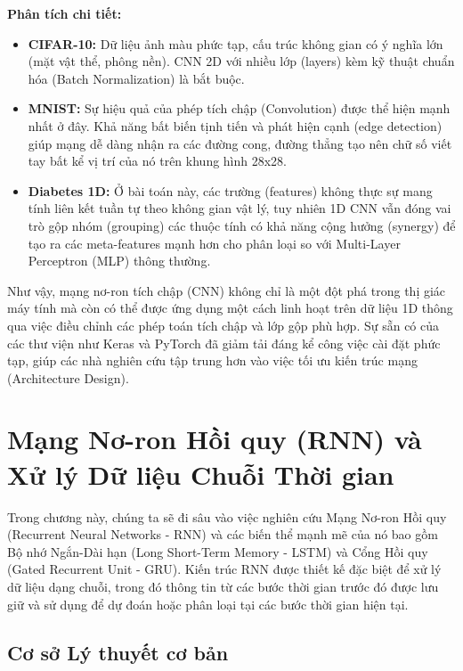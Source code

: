 \documentclass[12pt,a4paper]{article}
\begin{document}
\textbf{Phân tích chi tiết:}
\begin{itemize}
    \item \textbf{CIFAR-10:} Dữ liệu ảnh màu phức tạp, cấu trúc không gian có ý nghĩa lớn (mặt vật thể, phông nền). CNN 2D với nhiều lớp (layers) kèm kỹ thuật chuẩn hóa (Batch Normalization) là bắt buộc.
    \item \textbf{MNIST:} Sự hiệu quả của phép tích chập (Convolution) được thể hiện mạnh nhất ở đây. Khả năng bất biến tịnh tiến và phát hiện cạnh (edge detection) giúp mạng dễ dàng nhận ra các đường cong, đường thẳng tạo nên chữ số viết tay bất kể vị trí của nó trên khung hình 28x28.
    \item \textbf{Diabetes 1D:} Ở bài toán này, các trường (features) không thực sự mang tính liên kết tuần tự theo không gian vật lý, tuy nhiên 1D CNN vẫn đóng vai trò gộp nhóm (grouping) các thuộc tính có khả năng cộng hưởng (synergy) để tạo ra các meta-features mạnh hơn cho phân loại so với Multi-Layer Perceptron (MLP) thông thường.
\end{itemize}

Như vậy, mạng nơ-ron tích chập (CNN) không chỉ là một đột phá trong thị giác máy tính mà còn có thể được ứng dụng một cách linh hoạt trên dữ liệu 1D thông qua việc điều chỉnh các phép toán tích chập và lớp gộp phù hợp. Sự sẵn có của các thư viện như Keras và PyTorch đã giảm tải đáng kể công việc cài đặt phức tạp, giúp các nhà nghiên cứu tập trung hơn vào việc tối ưu kiến trúc mạng (Architecture Design).


\newpage
\section{Mạng Nơ-ron Hồi quy (RNN) và Xử lý Dữ liệu Chuỗi Thời gian}

Trong chương này, chúng ta sẽ đi sâu vào việc nghiên cứu Mạng Nơ-ron Hồi quy (Recurrent Neural Networks - RNN) và các biến thể mạnh mẽ của nó bao gồm Bộ nhớ Ngắn-Dài hạn (Long Short-Term Memory - LSTM) và Cổng Hồi quy (Gated Recurrent Unit - GRU). Kiến trúc RNN được thiết kế đặc biệt để xử lý dữ liệu dạng chuỗi, trong đó thông tin từ các bước thời gian trước đó được lưu giữ và sử dụng để dự đoán hoặc phân loại tại các bước thời gian hiện tại.

\subsection{Cơ sở Lý thuyết cơ bản}
\end{document}
